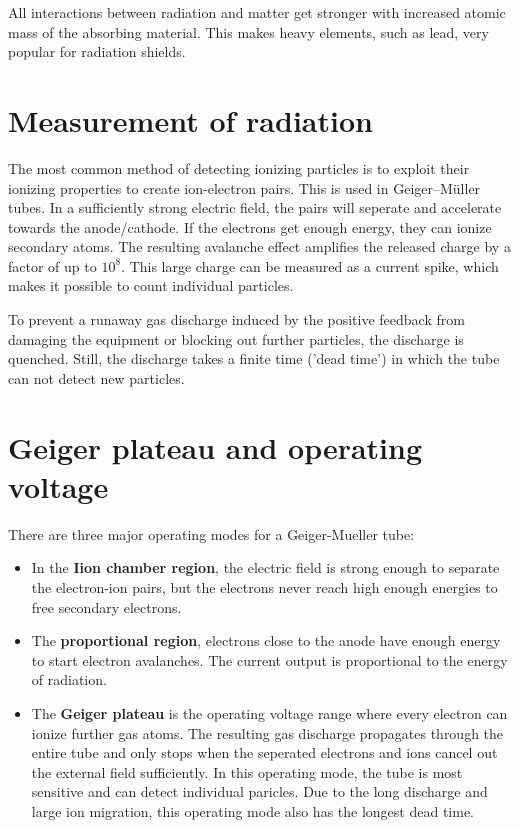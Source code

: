 All interactions between radiation and matter get stronger with increased atomic mass of the absorbing material.
This makes heavy elements, such as lead, very popular for radiation shields.

\section{Measurement of radiation}
The most common method of detecting ionizing particles is to exploit their ionizing properties to create ion-electron pairs.
This is used in Geiger–Müller tubes.
In a sufficiently strong electric field, the pairs will seperate and accelerate towards the anode/cathode.
If the electrons get enough energy, they can ionize secondary atoms.
The resulting avalanche effect amplifies the released charge by a factor of up to $10^8$.
This large charge can be measured as a current spike, which makes it possible to count individual particles.

To prevent a runaway gas discharge induced by the positive feedback from damaging the equipment or blocking out further particles, the discharge is quenched.
Still, the discharge takes a finite time ('dead time') in which the tube can not detect new particles.

\section{Geiger plateau and operating voltage}
There are three major operating modes for a Geiger-Mueller tube:
\begin{itemize}
	\item In the \textbf{Iion chamber region}, the electric field is strong enough to separate the electron-ion pairs, but the electrons never reach high enough energies to free secondary electrons.
	\item The \textbf{proportional region}, electrons close to the anode have enough energy to start electron avalanches. The current output is proportional to the energy of radiation.
	\item The \textbf{Geiger plateau} is the operating voltage range where every electron can ionize further gas atoms.
	The resulting gas discharge propagates through the entire tube and only stops when the seperated electrons and ions cancel out the external field sufficiently.
	In this operating mode, the tube is most sensitive and can detect individual paricles.
	Due to the long discharge and large ion migration, this operating mode also has the longest dead time.
\end{itemize}

